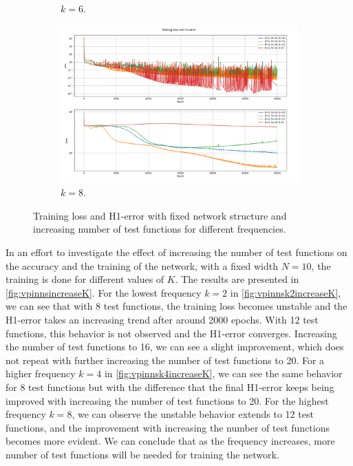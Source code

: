 \begin{figure}[h!]
\begin{subfigure}[b]{0.48\textwidth}
        \caption{$k=6$.}
        \label{fig:vpinnsk6increaseK}
    \end{subfigure}
    \hfill
    \begin{subfigure}[b]{0.48\textwidth}
        \includegraphics[width=\textwidth]{img/VPINN-Comparison-k8increaseK.png}
        \caption{$k=8$.}
        \label{fig:vpinnsk8increaseK}
    \end{subfigure}
    \caption{Training loss and H1-error with fixed network structure and increasing number of test functions for different frequencies.}
    \label{fig:vpinnsincreaseK}
\end{figure}

In an effort to investigate the effect of increasing the number of test functions on the accuracy and the training of the network, with a fixed width $N=10$, the training is done for different values of $K$. The results are presented in \autoref{fig:vpinnsincreaseK}. For the lowest frequency $k=2$ in \autoref{fig:vpinnsk2increaseK}, we can see that with 8 test functions, the training loss becomes unstable and the H1-error takes an increasing trend after around 2000 epochs. With 12 test functions, this behavior is not observed and the H1-error converges. Increasing the number of test functions to 16, we can see a slight improvement, which does not repeat with further increasing the number of test functions to 20. For a higher frequency $k=4$ in \autoref{fig:vpinnsk4increaseK}, we can see the same behavior for 8 test functions but with the difference that the final H1-error keeps being improved with increasing the number of test functions to 20. For the highest frequency $k=8$, we can observe the unstable behavior extends to 12 test functions, and the improvement with increasing the number of test functions becomes more evident. We can conclude that as the frequency increases, more number of test functions will be needed for training the network.

